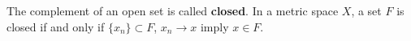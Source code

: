 The complement of an open set is called \textbf{closed}. In a metric space $X$, a set $F$ is closed if and only if $\{x_n\} \subset F$, $x_n \to x$ imply $x \in F$.
